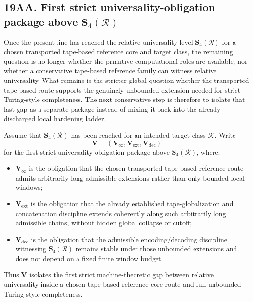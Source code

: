 \subsection*{19AA. First strict universality-obligation package above \(\mathbf S_4(\mathcal R)\)}
Once the present line has reached the relative universality level \(\mathbf S_4(\mathcal R)\) for a chosen transported tape-based reference core and target class, the remaining question is no longer whether the primitive computational roles are available, nor whether a conservative tape-based reference family can witness relative universality. What remains is the stricter global question whether the transported tape-based route supports the genuinely unbounded extension needed for strict Turing-style completeness. The next conservative step is therefore to isolate that last gap as a separate package instead of mixing it back into the already discharged local hardening ladder.

\begin{definition}
Assume that \(\mathbf S_4(\mathcal R)\) has been reached for an intended target class \(\mathcal K\). Write
\[
\mathbf V=(\mathbf V_\infty,\mathbf V_{\mathrm{ext}},\mathbf V_{\mathrm{dec}})
\]
for the first strict universality-obligation package above \(\mathbf S_4(\mathcal R)\), where:
\begin{itemize}[leftmargin=2em]
  \item \(\mathbf V_\infty\) is the obligation that the chosen transported tape-based reference route admits arbitrarily long admissible extensions rather than only bounded local windows;
  \item \(\mathbf V_{\mathrm{ext}}\) is the obligation that the already established tape-globalization and concatenation discipline extends coherently along such arbitrarily long admissible chains, without hidden global collapse or cutoff;
  \item \(\mathbf V_{\mathrm{dec}}\) is the obligation that the admissible encoding/decoding discipline witnessing \(\mathbf S_4(\mathcal R)\) remains stable under those unbounded extensions and does not depend on a fixed finite window budget.
\end{itemize}
Thus \(\mathbf V\) isolates the first strict machine-theoretic gap between relative universality inside a chosen tape-based reference-core route and full unbounded Turing-style completeness.
\end{definition}

